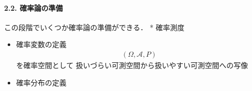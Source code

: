 \documentclass[letterpaper,10pt,english]{sphinxmanual}
\begin{document}
\paragraph{2.2. 確率論の準備}
\label{\detokenize{src/stochasticcalculus/2020-03-16-lebesgue:id10}}
\sphinxAtStartPar
この段階でいくつか確率論の準備ができる． * 確率測度
\begin{itemize}
\item {} 
\sphinxAtStartPar
確率変数の定義
\begin{equation*}
\begin{split}(\Omega,\mathcal{A},P)\end{split}
\end{equation*}
\sphinxAtStartPar
を確率空間として 扱いづらい可測空間から扱いやすい可測空間への写像

\item {} 
\sphinxAtStartPar
確率分布の定義

\end{itemize}
\end{document}
